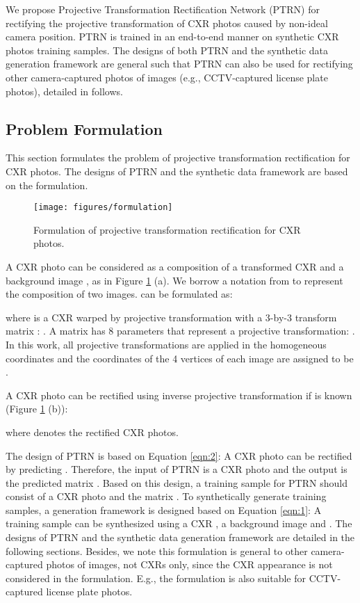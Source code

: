 \documentclass[preprint, 12pt]{elsarticle}
\begin{document}
We propose Projective Transformation Rectification Network (PTRN) for rectifying the projective transformation of CXR photos caused by non-ideal camera position. PTRN is trained in an end-to-end manner on synthetic CXR photos training samples. The designs of both PTRN and the synthetic data generation framework are general such that PTRN can also be used for rectifying other camera-captured photos of images (e.g., CCTV-captured license plate photos), detailed in follows.

\subsection{Problem Formulation}

This section formulates the problem of projective transformation rectification for CXR photos. The designs of PTRN and the synthetic data framework are based on the formulation.

\begin{figure}
    \centering
    \texttt{[image: figures/formulation]}
    \caption{Formulation of projective transformation rectification for CXR photos.}
    \label{fig:formulation}
\end{figure}

A CXR photo  can be considered as a composition of a transformed CXR  and a background image , as in Figure \ref{fig:formulation} (a). We borrow a notation  from \cite{lin2018st} to represent the composition of two images.  can be formulated as:

where  is a CXR  warped by projective transformation with a 3-by-3 transform matrix : . A matrix  has 8 parameters  that represent a projective transformation: 
. In this work, all projective transformations are applied in the homogeneous coordinates and the coordinates of the 4 vertices of each image are assigned to be .

A CXR photo  can be rectified using inverse projective transformation if  is known (Figure \ref{fig:formulation} (b)):

where  denotes the rectified CXR photos.

The design of PTRN is based on Equation \ref{eqn:2}: A CXR photo  can be rectified by predicting . Therefore, the input of PTRN is a CXR photo  and the output is the predicted matrix . Based on this design, a training sample for PTRN should consist of a CXR photo  and the matrix . To synthetically generate training samples, a generation framework is designed based on Equation \ref{eqn:1}: A training sample  can be synthesized using a CXR , a background image  and . The designs of PTRN and the synthetic data generation framework are detailed in the following sections. Besides, we note this formulation is general to other camera-captured photos of images, not CXRs only, since the CXR appearance is not considered in the formulation. E.g., the formulation is also suitable for CCTV-captured license plate photos.
\end{document}
